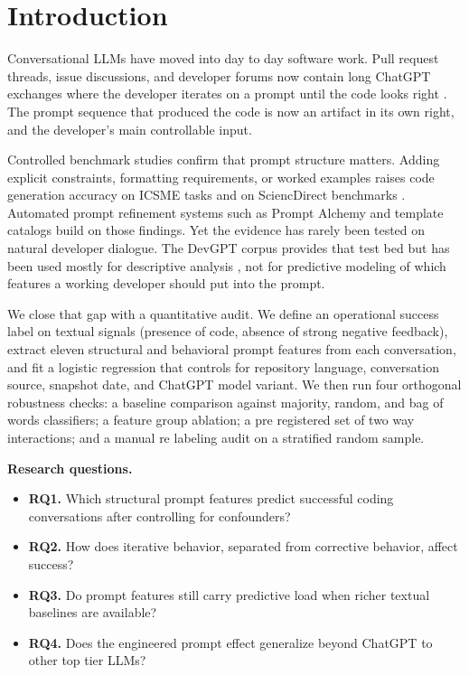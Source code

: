 \documentclass[conference]{IEEEtran}
\begin{document}
\section{Introduction}
Conversational LLMs have moved into day to day software work. Pull request threads, issue discussions, and developer forums now contain long ChatGPT exchanges where the developer iterates on a prompt until the code looks right \cite{empirical2024chatgpt}. The prompt sequence that produced the code is now an artifact in its own right, and the developer's main controllable input.

Controlled benchmark studies confirm that prompt structure matters. Adding explicit constraints, formatting requirements, or worked examples raises code generation accuracy on ICSME tasks \cite{icsme2025prompting} and on SciencDirect benchmarks \cite{elsevier2025promptengineering}. Automated prompt refinement systems such as Prompt Alchemy \cite{ye2025promptalchemy} and template catalogs \cite{schmidt2023promptcatalog} build on those findings. Yet the evidence has rarely been tested on natural developer dialogue. The DevGPT corpus \cite{xiao2023devgpt} provides that test bed but has been used mostly for descriptive analysis \cite{wu2024promptpatterns}, not for predictive modeling of which features a working developer should put into the prompt.

We close that gap with a quantitative audit. We define an operational success label on textual signals (presence of code, absence of strong negative feedback), extract eleven structural and behavioral prompt features from each conversation, and fit a logistic regression that controls for repository language, conversation source, snapshot date, and ChatGPT model variant. We then run four orthogonal robustness checks: a baseline comparison against majority, random, and bag of words classifiers; a feature group ablation; a pre registered set of two way interactions; and a manual re labeling audit on a stratified random sample.

\noindent\textbf{Research questions.}
\begin{itemize}
\item \textbf{RQ1.} Which structural prompt features predict successful coding conversations after controlling for confounders?
\item \textbf{RQ2.} How does iterative behavior, separated from corrective behavior, affect success?
\item \textbf{RQ3.} Do prompt features still carry predictive load when richer textual baselines are available?
\item \textbf{RQ4.} Does the engineered prompt effect generalize beyond ChatGPT to other top tier LLMs?
\end{itemize}
\end{document}
